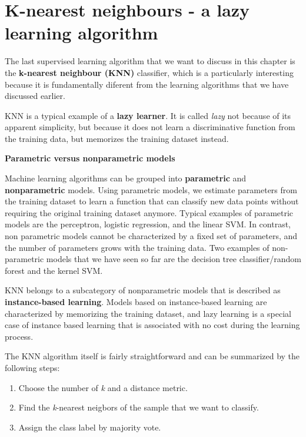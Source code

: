 \documentclass[11pt]{article}
\providecommand{\tightlist}{%
      \setlength{\itemsep}{0pt}\setlength{\parskip}{0pt}}
\begin{document}
    \section{K-nearest neighbours - a lazy learning
algorithm}\label{k-nearest-neighbours---a-lazy-learning-algorithm}

    The last supervised learning algorithm that we want to discuss in this
chapter is the \textbf{k-nearest neighbour (KNN)} classifier, which is a
particularly interesting because it is fundamentally diferent from the
learning algorithms that we have discussed earlier.

KNN is a typical example of a \textbf{lazy learner}. It is called
\emph{lazy} not because of its apparent simplicity, but because it does
not learn a discriminative function from the training data, but
memorizes the training dataset instead.

\textbf{Parametric versus nonparametric models}

Machine learning algorithms can be grouped into \textbf{parametric} and
\textbf{nonparametric} models. Using parametric models, we estimate
parameters from the training dataset to learn a function that can
classify new data points without requiring the original training dataset
anymore. Typical examples of parametric models are the perceptron,
logistic regression, and the linear SVM. In contrast, non parametric
models cannot be characterized by a fixed set of parameters, and the
number of parameters grows with the training data. Two examples of
non-parametric models that we have seen so far are the decision tree
classifier/random forest and the kernel SVM.

KNN belongs to a subcategory of nonparametric models that is described
as \textbf{instance-based learning}. Models based on instance-based
learning are characterized by memorizing the training dataset, and lazy
learning is a special case of instance based learning that is associated
with no cost during the learning process.

The KNN algorithm itself is fairly straightforward and can be summarized
by the following steps:

\begin{enumerate}
\def\labelenumi{\arabic{enumi}.}
\tightlist
\item
  Choose the number of \emph{k} and a distance metric.
\item
  Find the \emph{k}-nearest neigbors of the sample that we want to
  classify.
\item
  Assign the class label by majority vote.
\end{enumerate}
\end{document}
